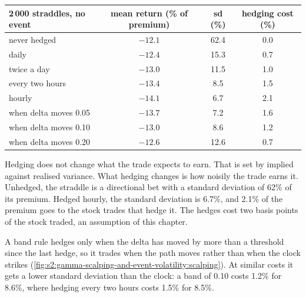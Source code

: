\begin{center}
\small
\begin{tabular}{@{}lccc@{}}
\toprule
2\,000 straddles, no event & mean return (\% of premium) & sd (\%) & hedging cost (\%)\\
\midrule
never hedged & $-12.1$ & 62.4 & 0.0\\
daily & $-12.4$ & 15.3 & 0.7\\
twice a day & $-13.0$ & 11.5 & 1.0\\
every two hours & $-13.4$ & 8.5 & 1.5\\
hourly & $-14.1$ & 6.7 & 2.1\\
when delta moves 0.05 & $-13.7$ & 7.2 & 1.6\\
when delta moves 0.10 & $-13.0$ & 8.6 & 1.2\\
when delta moves 0.20 & $-12.6$ & 12.6 & 0.7\\
\bottomrule
\end{tabular}
\end{center}

Hedging does not change what the trade expects to earn. That is set by implied against realised variance. What hedging changes is how noisily the
trade earns it. Unhedged, the straddle is a directional bet with a standard deviation of 62\% of its premium. Hedged hourly, the standard deviation is
6.7\%, and 2.1\% of the premium goes to the stock trades that hedge it. The hedges cost two basis points of the stock traded, an assumption of this
chapter.

A band rule hedges only when the delta has moved by more than a threshold since the last hedge, so it trades when the path moves rather than when the
clock strikes (\cref{fig:s2:gamma-scalping-and-event-volatility:scalping}). At similar costs it gets a lower standard deviation than the clock: a band of
0.10 costs 1.2\% for 8.6\%, where hedging every two hours costs 1.5\% for 8.5\%.

